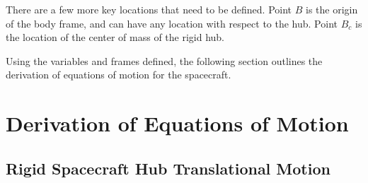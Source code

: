 \documentclass[paper]{aiaaNew}
\begin{document}
	There are a few more key locations that need to be defined. Point $B$ is the origin of the body frame, and can have any location with respect to the hub. Point $B_c$ is the location of the center of mass of the rigid hub.
	
	Using the variables and frames defined, the following section outlines the derivation of equations of motion for the spacecraft. 
	
	\section{Derivation of Equations of Motion}
	
	\subsection{Rigid Spacecraft Hub Translational Motion}
	
\end{document}
